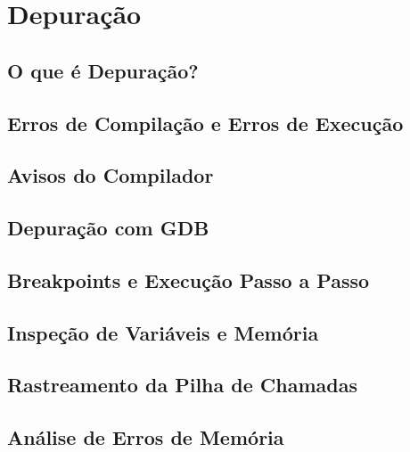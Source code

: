 \chapter{Depuração}

\section{O que é Depuração?}

\section{Erros de Compilação e Erros de Execução}

\section{Avisos do Compilador}

\section{Depuração com GDB}

\section{Breakpoints e Execução Passo a Passo}

\section{Inspeção de Variáveis e Memória}

\section{Rastreamento da Pilha de Chamadas}

\section{Análise de Erros de Memória}

